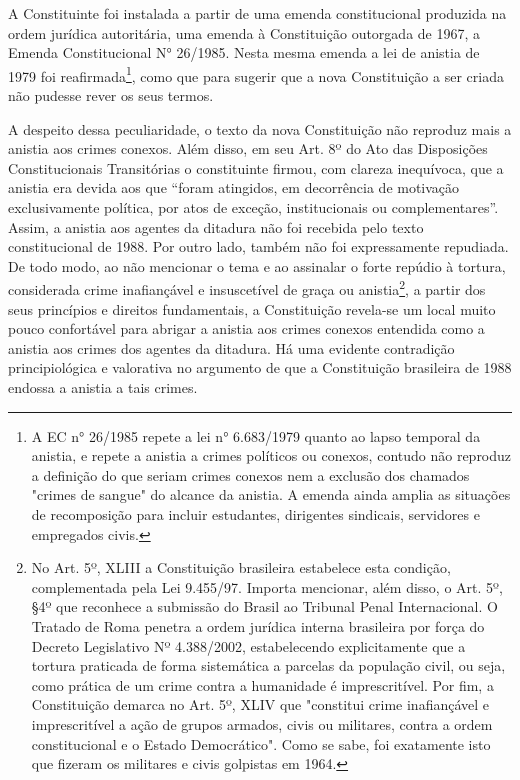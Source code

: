 A Constituinte foi instalada a partir de uma emenda constitucional
produzida na ordem jurídica autoritária, uma emenda à Constituição
outorgada de 1967, a Emenda Constitucional N° 26/1985. Nesta mesma
emenda a lei de anistia de 1979 foi reafirmada\footnote{A EC n° 26/1985
  repete a lei n° 6.683/1979 quanto ao lapso temporal da anistia, e
  repete a anistia a crimes políticos ou conexos, contudo não reproduz a
  definição do que seriam crimes conexos nem a exclusão dos chamados
  "crimes de sangue" do alcance da anistia. A emenda ainda amplia as
  situações de recomposição para incluir estudantes, dirigentes
  sindicais, servidores e empregados civis.}, como que para sugerir que
a nova Constituição a ser criada não pudesse rever os seus termos.

A despeito dessa peculiaridade, o texto da nova Constituição não
reproduz mais a anistia aos crimes conexos. Além disso, em seu Art. 8º
do Ato das Disposições Constitucionais Transitórias o constituinte
firmou, com clareza inequívoca, que a anistia era devida aos que ``foram
atingidos, em decorrência de motivação exclusivamente política, por atos
de exceção, institucionais ou complementares''. Assim, a anistia aos
agentes da ditadura não foi recebida pelo texto constitucional de 1988.
Por outro lado, também não foi expressamente repudiada. De todo modo, ao
não mencionar o tema e ao assinalar o forte repúdio à tortura,
considerada crime inafiançável e insuscetível de graça ou
anistia\footnote{No Art. 5º, XLIII a Constituição brasileira estabelece
  esta condição, complementada pela Lei 9.455/97. Importa mencionar,
  além disso, o Art. 5º, §4º que reconhece a submissão do Brasil ao
  Tribunal Penal Internacional. O Tratado de Roma penetra a ordem
  jurídica interna brasileira por força do Decreto Legislativo Nº
  4.388/2002, estabelecendo explicitamente que a tortura praticada de
  forma sistemática a parcelas da população civil, ou seja, como prática
  de um crime contra a humanidade é imprescritível. Por fim, a
  Constituição demarca no Art. 5º, XLIV que "constitui crime
  inafiançável e imprescritível a ação de grupos armados, civis ou
  militares, contra a ordem constitucional e o Estado Democrático". Como
  se sabe, foi exatamente isto que fizeram os militares e civis
  golpistas em 1964.}, a partir dos seus princípios e direitos
fundamentais, a Constituição revela-se um local muito pouco confortável
para abrigar a anistia aos crimes conexos entendida como a anistia aos
crimes dos agentes da ditadura. Há uma evidente contradição
principiológica e valorativa no argumento de que a Constituição
brasileira de 1988 endossa a anistia a tais crimes.

